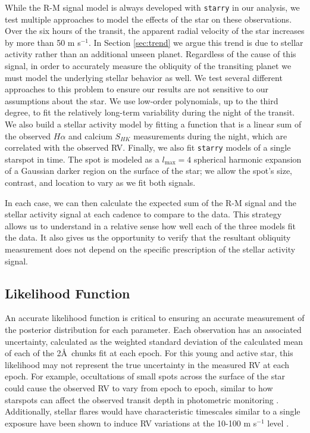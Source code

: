 \documentclass[twocolumn]{aastex63}
\begin{document}
While the R-M signal model is always developed with \texttt{starry} in our analysis, we test multiple approaches to model the effects of the star on these observations.
Over the six hours of the transit, the apparent radial velocity of the star increases by more than 50 m s$^{-1}$. 
In Section \ref{sec:trend} we argue this trend is due to stellar activity rather than an additional unseen planet.
Regardless of the cause of this signal, in order to accurately measure the obliquity of the transiting planet we must model the underlying stellar behavior as well.
We test several different approaches to this problem to ensure our results are not sensitive to our assumptions about the star.
We use low-order polynomials, up to the third degree, to fit the relatively long-term variability during the night of the transit. 
We also build a stellar activity model by fitting a function that is a linear sum of the observed $H\alpha$ and calcium $S_{HK}$ measurements during the night, which are correlated with the observed RV.
Finally, we also fit \texttt{starry} models of a single starspot in time. The spot is modeled as a $l_\mathrm{max} = 4$ spherical harmonic expansion of a Gaussian darker region on the surface of the star; we allow the spot's size, contrast, and location to vary as we fit both signals.


In each case, we can then calculate the expected sum of the R-M signal and the stellar activity signal at each cadence to compare to the data. 
This strategy allows us to understand in a relative sense how well each of the three models fit the data. 
It also gives us the opportunity to verify that the resultant obliquity measurement does not depend on the specific prescription of the stellar activity signal.




\subsection{Likelihood Function}

An accurate likelihood function is critical to ensuring an accurate measurement of the posterior distribution for each parameter.
Each observation has an associated uncertainty, calculated as the weighted standard deviation of the calculated mean of each of the 2\AA\ chunks fit at each epoch.
For this young and active star, this likelihood may not represent the true uncertainty in the measured RV at each epoch. 
For example, occultations of small spots across the surface of the star could cause the observed RV to vary from epoch to epoch, similar to how starspots can affect the observed transit depth in photometric monitoring \citep{SanchisOjeda13}.
Additionally, stellar flares would have characteristic timescales similar to a single exposure have been shown to induce RV variations at the 10-100 m s$^{-1}$ level \citep{Reiners09}.
\end{document}

